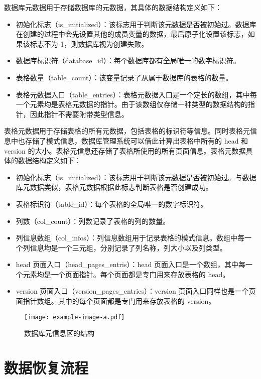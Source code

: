 数据库元数据用于存储数据库的元数据，其具体的数据结构定义如下：
\begin{itemize}
    \item 初始化标志（is\_initialized）：该标志用于判断该元数据是否被初始过。数据库在创建的过程中会先设置其他的成员变量的数据，最后原子化设置该标志，如果该标志不为 1，则数据库视为创建失败。
    \item 数据库标识符（database\_id）：每个数据库都有全局唯一的数字标识符。
    \item 表格数量（table\_count）：该变量记录了从属于数据库的表格的数量。
    \item 表格元数据入口（table\_entries）：表格元数据入口是一个定长的数组，其中每一个元素均是表格元数据的指针。由于该数组仅存储一种类型的数据结构的指针，因此指针不需要附带类型信息。
\end{itemize}

表格元数据用于存储表格的所有元数据，包括表格的标识符等信息。同时表格元信息中也存储了模式信息，数据库管理系统可以借此计算出表格中所有的 head 和 version 的大小。表格元信息还存储了表格所使用的所有页面信息。表格元数据具体的数据结构定义如下：
\begin{itemize}
    \item 初始化标志（is\_initialized）：该标志用于判断该元数据是否被初始过。与数据库元数据类似，表格元数据根据此标志判断表格是否创建成功。
    \item 表格标识符（table\_id）：每个表格的全局唯一的数字标识符。
    \item 列数（col\_count）：列数记录了表格的列的数量。
    \item 列信息数组（col\_infos）：列信息数组用于记录表格的模式信息。数组中每一个列信息均是一个三元组，分别记录了列名称，列大小以及列类型。
    \item head 页面入口（head\_pages\_entris）：head 页面入口是一个数组，其中每一个元素均是一个页面指针。每个页面都是专门用来存放表格的 head。
    \item version 页面入口（version\_pages\_entries）：version 页面入口同样也是一个页面指针数组。其中的每个页面都是专门用来存放表格的 version。
\end{itemize}

\begin{figure}
    \centering
    \texttt{[image: example-image-a.pdf]}
    \caption{数据库元信息区的结构}
    \label{fig:catalog}
\end{figure}

\section{数据恢复流程}

